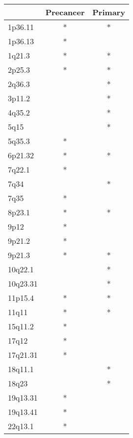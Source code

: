 \begin{tabular}{lcc}
\toprule
{} & Precancer & Primary \\
\midrule
1p36.11  &         * &       * \\
1p36.13  &         * &         \\
1q21.3   &         * &       * \\
2p25.3   &         * &       * \\
2q36.3   &           &       * \\
3p11.2   &           &       * \\
4q35.2   &           &       * \\
5q15     &           &       * \\
5q35.3   &         * &         \\
6p21.32  &         * &       * \\
7q22.1   &         * &         \\
7q34     &           &       * \\
7q35     &         * &         \\
8p23.1   &         * &       * \\
9p12     &         * &         \\
9p21.2   &         * &         \\
9p21.3   &         * &       * \\
10q22.1  &           &       * \\
10q23.31 &           &       * \\
11p15.4  &         * &       * \\
11q11    &         * &       * \\
15q11.2  &         * &         \\
17q12    &         * &         \\
17q21.31 &         * &         \\
18q11.1  &           &       * \\
18q23    &           &       * \\
19q13.31 &         * &         \\
19q13.41 &         * &         \\
22q13.1  &         * &         \\
\bottomrule
\end{tabular}
